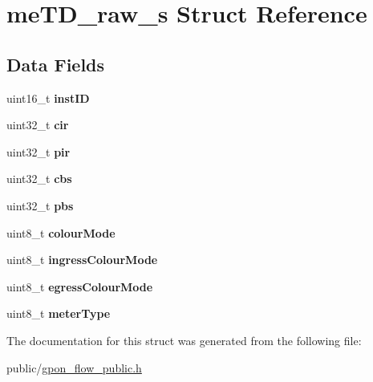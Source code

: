 \hypertarget{structmeTD__raw__s}{}\section{me\+T\+D\+\_\+raw\+\_\+s Struct Reference}
\label{structmeTD__raw__s}
\subsection*{Data Fields}
\begin{DoxyCompactItemize}
\item 
\mbox{\label{structmeTD__raw__s_acee3f3dc40175a6f3ff2bf3fac0da649}} 
uint16\+\_\+t {\bfseries inst\+ID}
\item 
\mbox{\label{structmeTD__raw__s_a454474db65d4abffbfb75759e73e7d13}} 
uint32\+\_\+t {\bfseries cir}
\item 
\mbox{\label{structmeTD__raw__s_af157f82db058711469ac4d53772cfd17}} 
uint32\+\_\+t {\bfseries pir}
\item 
\mbox{\label{structmeTD__raw__s_a4bf2938538d7d0f46ccfb80cc64ecfc8}} 
uint32\+\_\+t {\bfseries cbs}
\item 
\mbox{\label{structmeTD__raw__s_ad8cb221acc14a4b7645d26d412ea8568}} 
uint32\+\_\+t {\bfseries pbs}
\item 
\mbox{\label{structmeTD__raw__s_a70e4024b0125885047b8ec31b84ee084}} 
uint8\+\_\+t {\bfseries colour\+Mode}
\item 
\mbox{\label{structmeTD__raw__s_a1ac25f3800b6598a58cb324db1ac7af8}} 
uint8\+\_\+t {\bfseries ingress\+Colour\+Mode}
\item 
\mbox{\label{structmeTD__raw__s_af88aef6a9d41233b1dba91f59c0dab97}} 
uint8\+\_\+t {\bfseries egress\+Colour\+Mode}
\item 
\mbox{\label{structmeTD__raw__s_ae54c0244405d14c4e1637afe6aa3e771}} 
uint8\+\_\+t {\bfseries meter\+Type}
\end{DoxyCompactItemize}


The documentation for this struct was generated from the following file\+:\begin{DoxyCompactItemize}
\item 
public/\hyperlink{gpon__flow__public_8h}{gpon\+\_\+flow\+\_\+public.\+h}\end{DoxyCompactItemize}
